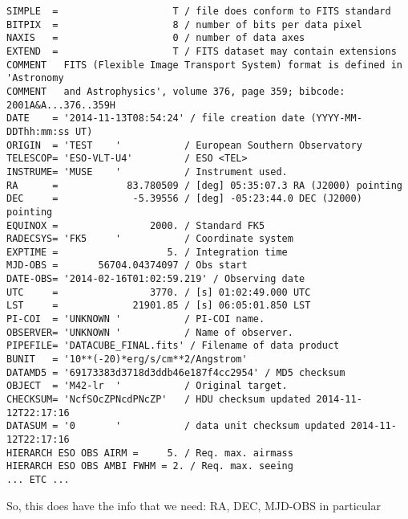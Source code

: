 \documentclass[11pt]{article}
\begin{document}
\begin{enumerate}
\begin{verbatim}
SIMPLE  =                    T / file does conform to FITS standard             
BITPIX  =                    8 / number of bits per data pixel                  
NAXIS   =                    0 / number of data axes                            
EXTEND  =                    T / FITS dataset may contain extensions            
COMMENT   FITS (Flexible Image Transport System) format is defined in 'Astronomy
COMMENT   and Astrophysics', volume 376, page 359; bibcode: 2001A&A...376..359H 
DATE    = '2014-11-13T08:54:24' / file creation date (YYYY-MM-DDThh:mm:ss UT)   
ORIGIN  = 'TEST    '           / European Southern Observatory                  
TELESCOP= 'ESO-VLT-U4'         / ESO <TEL>                                      
INSTRUME= 'MUSE    '           / Instrument used.                               
RA      =            83.780509 / [deg] 05:35:07.3 RA (J2000) pointing           
DEC     =             -5.39556 / [deg] -05:23:44.0 DEC (J2000) pointing         
EQUINOX =                2000. / Standard FK5                                   
RADECSYS= 'FK5     '           / Coordinate system                              
EXPTIME =                   5. / Integration time                               
MJD-OBS =       56704.04374097 / Obs start                                      
DATE-OBS= '2014-02-16T01:02:59.219' / Observing date                            
UTC     =                3770. / [s] 01:02:49.000 UTC                           
LST     =             21901.85 / [s] 06:05:01.850 LST                           
PI-COI  = 'UNKNOWN '           / PI-COI name.                                   
OBSERVER= 'UNKNOWN '           / Name of observer.                              
PIPEFILE= 'DATACUBE_FINAL.fits' / Filename of data product                      
BUNIT   = '10**(-20)*erg/s/cm**2/Angstrom'                                      
DATAMD5 = '69173383d3718d3ddb46e187f4cc2954' / MD5 checksum                     
OBJECT  = 'M42-lr  '           / Original target.                               
CHECKSUM= 'NcfSOcZPNcdPNcZP'   / HDU checksum updated 2014-11-12T22:17:16       
DATASUM = '0       '           / data unit checksum updated 2014-11-12T22:17:16 
HIERARCH ESO OBS AIRM =     5. / Req. max. airmass                              
HIERARCH ESO OBS AMBI FWHM = 2. / Req. max. seeing 
... ETC ...
\end{verbatim}

So, this does have the info that we need: RA, DEC, MJD-OBS in particular
\end{enumerate}
\end{document}
